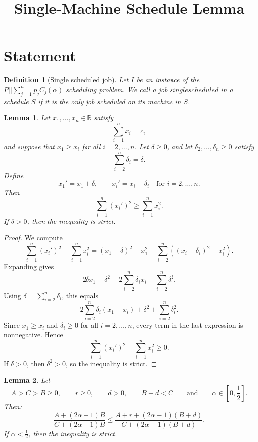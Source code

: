 \documentclass[11pt]{article}
\newtheorem{lemma}{Lemma}
\newtheorem{definition}{Definition}
\begin{document}
\title{Single-Machine Schedule Lemma}
\author{}
\date{}
\maketitle

\section{Statement}

\begin{definition}[Single scheduled job]
Let \(I\) be an instance of the \(P||\sum_{j=1}^{n}{p_j C_j}(\alpha)\) scheduling problem.
We call a job $single scheduled$ in a schedule $S$ if it is the only job scheduled on its machine in $S$.
\end{definition}

\begin{lemma} \label{lemma: Peak increase }
Let $x_1,\dots,x_n \in \mathbb{R}$ satisfy
\[
\sum_{i=1}^n x_i = c,
\]
and suppose that $x_1 \ge x_i$ for all $i=2,\dots,n$. Let $\delta\geq0$, and let
$\delta_2,\dots,\delta_n \ge 0$ satisfy
\[
\sum_{i=2}^n \delta_i = \delta.
\]
Define
\[
x_1' = x_1+\delta,
\qquad
x_i' = x_i-\delta_i \quad \text{for } i=2,\dots,n.
\]
Then
\[
\sum_{i=1}^n (x_i')^2 \geq \sum_{i=1}^n x_i^2.
\]
If \(\delta>0\), then the inequality is strict.
\end{lemma}

\begin{proof}
We compute
\[
\sum_{i=1}^n (x_i')^2-\sum_{i=1}^n x_i^2
=
(x_1+\delta)^2-x_1^2
+
\sum_{i=2}^n \left((x_i-\delta_i)^2-x_i^2\right).
\]
Expanding gives
\[
2\delta x_1+\delta^2
-
2\sum_{i=2}^n \delta_i x_i
+
\sum_{i=2}^n \delta_i^2.
\]
Using $\delta=\sum_{i=2}^n \delta_i$, this equals
\[
2\sum_{i=2}^n \delta_i(x_1-x_i)
+
\delta^2
+
\sum_{i=2}^n \delta_i^2.
\]
Since $x_1\ge x_i$ and $\delta_i\ge 0$ for all $i=2,\dots,n$, every
term in the last expression is nonnegative. Hence
\[
\sum_{i=1}^n (x_i')^2-\sum_{i=1}^n x_i^2 \geq 0.
\]
If \(\delta>0\), then \(\delta^2>0\), so the inequality is strict.
\end{proof}

\begin{lemma}\label{lem: A,B,C,r}
Let
\[
A>C>B\ge 0,\qquad r\geq0,\qquad d>0,\qquad B+d<C
\qquad \text{and} \qquad \alpha \in [0, \frac12].
\]
Then: 
\[
\frac{A+(2\alpha-1)B}{C+(2\alpha-1)B}
\le
\frac{A+r+(2\alpha-1)(B+d)}{C+(2\alpha-1)(B+d)}.
\]
If \(\alpha<\frac12\), then the inequality is strict.
\end{lemma}
\end{document}
